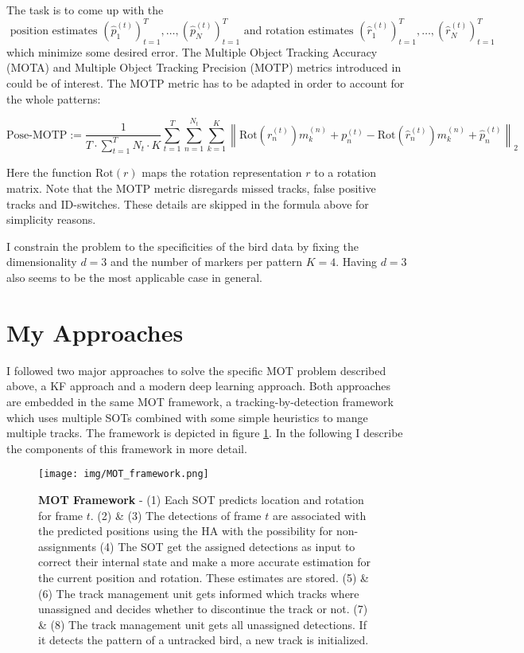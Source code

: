 \documentclass{article}
\begin{document}
The task is to come up with the $$ \text{ position estimates } \left(\hat{p}^{(t)}_1\right)_{t=1}^T, \dots,\left(\hat{p}^{(t)}_N\right)_{t=1}^T \text{ and rotation estimates } \left(\hat{r}^{(t)}_1\right)_{t=1}^T, \dots,\left(\hat{r}^{(t)}_N\right)_{t=1}^T$$ which minimize some desired error. The Multiple Object Tracking Accuracy (MOTA) and Multiple Object Tracking Precision (MOTP) metrics introduced in \cite{mot_metrics} could be of interest. The MOTP metric has to be adapted in order to account for the whole patterns:

\begin{equation}
	\text{Pose-MOTP} := \frac{1}{T\cdot \sum_{t=1}^TN_t \cdot K}\sum_{t=1}^{T}\sum_{n=1}^{N_t} \sum_{k=1}^{K} \left\| \text{Rot}(r^{(t)}_n)m^{(n)}_k + p^{(t)}_n - \text{Rot}(\hat{r}^{(t)}_n)m^{(n)}_k + \hat{p}^{(t)}_n \right\|_2
\end{equation}

Here the function $\text{Rot}(r)$ maps the rotation representation $r$ to a rotation matrix. Note that the MOTP metric disregards missed tracks, false positive tracks and ID-switches. These details are skipped in the formula above for simplicity reasons.

I constrain the problem to the specificities of the bird data by fixing the dimensionality $d=3$ and the number of markers per pattern $K=4$. Having $d=3$ also seems to be the most applicable case in general.


\section{My Approaches}
\label{approaches}
I followed two major approaches to solve the specific MOT problem described above, a KF approach and a modern deep learning approach. Both approaches are embedded in the same MOT framework, a tracking-by-detection framework which uses multiple SOTs combined with some simple heuristics to mange multiple tracks. The framework is depicted in figure \ref{flow_chart}. In the following I describe the components of this framework in more detail.


\begin{figure}[!htbp]
	\begin{center}
		\texttt{[image: img/MOT\_framework.png]}
		\caption{ \textbf{MOT Framework} - 
			(1) Each SOT predicts location and rotation for frame $t$. (2) \& (3) The detections of frame $t$ are associated with the predicted positions using the HA with the possibility for non-assignments (4) The SOT get the assigned detections as input to correct their internal state and make a more accurate estimation for the current position and rotation. These estimates are stored. (5) \& (6) The track management unit gets informed which tracks where unassigned and decides whether to discontinue the track or not. (7) \& (8) The track management unit gets all unassigned detections. If it detects the pattern of a untracked bird, a new track is initialized. }
		\label{flow_chart}
	\end{center}
\end{figure}
\end{document}
